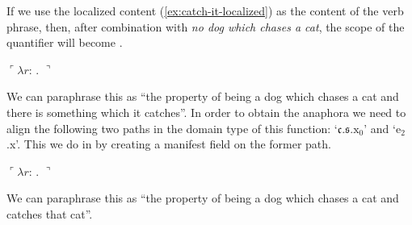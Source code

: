 If we use the localized content (\ref{ex:catch-it-localized}) as the
content of the verb phrase, then, after combination with \textit{no
  dog which chases a cat}, the scope of the quantifier will become
\nexteg{}.
\begin{ex} 
  $\ulcorner\lambda r$:
   .
  $\urcorner$
\end{ex}



We can paraphrase this as ``the property of being a dog which chases a
cat and there is something which it catches''.  In order to obtain the
anaphora we need to align the following two paths in the domain type
of this function: `$\mathfrak{c}.\mathfrak{s}.\text{x}_0$' and
`e$_2$.x'.  This we do in \nexteg{} by creating a manifest field on
the former path.

\begin{ex} 
  $\ulcorner\lambda r$:
   .
  $\urcorner$
\end{ex}
We can paraphrase this as ``the property of being a dog which chases a
cat and catches that cat''.

